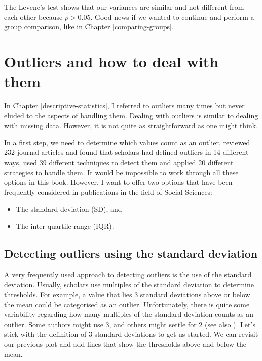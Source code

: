 \documentclass[
]{book}
\begin{document}
The Levene's test shows that our variances are similar and not different from each other because \(p > 0.05\). Good news if we wanted to continue and perform a group comparison, like in Chapter \ref{comparing-groups}.

\hypertarget{dealing-with-outliers}{%
\section{Outliers and how to deal with them}\label{dealing-with-outliers}}

In Chapter \ref{descriptive-statistics}, I referred to outliers many times but never eluded to the aspects of handling them. Dealing with outliers is similar to dealing with missing data. However, it is not quite as straightforward as one might think.

In a first step, we need to determine which values count as an outlier. \citet{aguinis2013best} reviewed 232 journal articles and found that scholars had defined outliers in 14 different ways, used 39 different techniques to detect them and applied 20 different strategies to handle them. It would be impossible to work through all these options in this book. However, I want to offer two options that have been frequently considered in publications in the field of Social Sciences:

\begin{itemize}
\item
  The standard deviation (SD), and
\item
  The inter-quartile range (IQR).
\end{itemize}

\hypertarget{ouliers-standard_deviation}{%
\subsection{Detecting outliers using the standard deviation}\label{ouliers-standard_deviation}}

A very frequently used approach to detecting outliers is the use of the standard deviation. Usually, scholars use multiples of the standard deviation to determine thresholds. For example, a value that lies 3 standard deviations above or below the mean could be categorised as an outlier. Unfortunately, there is quite some variability regarding how many multiples of the standard deviation counts as an outlier. Some authors might use 3, and others might settle for 2 (see also \citet{leys2013detecting}). Let's stick with the definition of 3 standard deviations to get us started. We can revisit our previous plot and add lines that show the thresholds above and below the mean.
\end{document}
